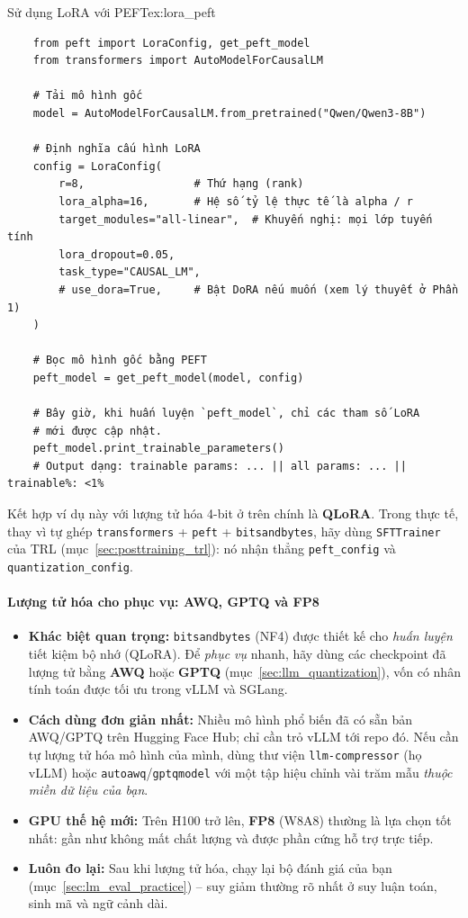 \begin{example}{Sử dụng LoRA với PEFT}{ex:lora_peft}
    \begin{verbatim}
    from peft import LoraConfig, get_peft_model
    from transformers import AutoModelForCausalLM

    # Tải mô hình gốc
    model = AutoModelForCausalLM.from_pretrained("Qwen/Qwen3-8B")

    # Định nghĩa cấu hình LoRA
    config = LoraConfig(
        r=8,                 # Thứ hạng (rank)
        lora_alpha=16,       # Hệ số tỷ lệ thực tế là alpha / r
        target_modules="all-linear",  # Khuyến nghị: mọi lớp tuyến tính
        lora_dropout=0.05,
        task_type="CAUSAL_LM",
        # use_dora=True,     # Bật DoRA nếu muốn (xem lý thuyết ở Phần 1)
    )

    # Bọc mô hình gốc bằng PEFT
    peft_model = get_peft_model(model, config)

    # Bây giờ, khi huấn luyện `peft_model`, chỉ các tham số LoRA
    # mới được cập nhật.
    peft_model.print_trainable_parameters()
    # Output dạng: trainable params: ... || all params: ... || trainable%: <1%
    \end{verbatim}
\end{example}

Kết hợp ví dụ này với lượng tử hóa 4-bit ở trên chính là \textbf{QLoRA}. Trong thực tế, thay vì tự ghép \texttt{transformers} + \texttt{peft} + \texttt{bitsandbytes}, hãy dùng \texttt{SFTTrainer} của TRL (mục~\ref{sec:posttraining_trl}): nó nhận thẳng \texttt{peft\_config} và \texttt{quantization\_config}.

\paragraph{Lượng tử hóa cho phục vụ: AWQ, GPTQ và FP8}
\begin{itemize}
	\item \textbf{Khác biệt quan trọng:} \texttt{bitsandbytes} (NF4) được thiết kế cho \emph{huấn luyện} tiết kiệm bộ nhớ (QLoRA). Để \emph{phục vụ} nhanh, hãy dùng các checkpoint đã lượng tử bằng \textbf{AWQ} hoặc \textbf{GPTQ} (mục~\ref{sec:llm_quantization}), vốn có nhân tính toán được tối ưu trong vLLM và SGLang.
	\item \textbf{Cách dùng đơn giản nhất:} Nhiều mô hình phổ biến đã có sẵn bản AWQ/GPTQ trên Hugging Face Hub; chỉ cần trỏ vLLM tới repo đó. Nếu cần tự lượng tử hóa mô hình của mình, dùng thư viện \texttt{llm-compressor} (họ vLLM) hoặc \texttt{autoawq}/\texttt{gptqmodel} với một tập hiệu chỉnh vài trăm mẫu \emph{thuộc miền dữ liệu của bạn}.
	\item \textbf{GPU thế hệ mới:} Trên H100 trở lên, \textbf{FP8} (W8A8) thường là lựa chọn tốt nhất: gần như không mất chất lượng và được phần cứng hỗ trợ trực tiếp.
	\item \textbf{Luôn đo lại:} Sau khi lượng tử hóa, chạy lại bộ đánh giá của bạn (mục~\ref{sec:lm_eval_practice}) -- suy giảm thường rõ nhất ở suy luận toán, sinh mã và ngữ cảnh dài.
\end{itemize}

